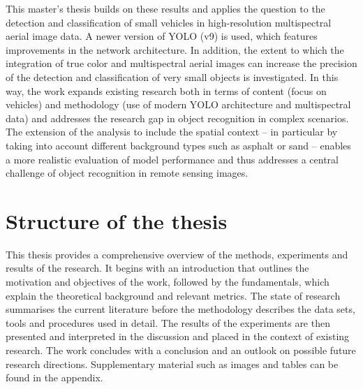 This master's thesis builds on these results and applies the question to the detection and classification of small vehicles in high-resolution multispectral aerial image data. A newer version of \acrshort{YOLO} (v9) is used, which features improvements in the network architecture. In addition, the extent to which the integration of true color and multispectral aerial images can increase the precision of the detection and classification of very small objects is investigated. In this way, the work expands existing research both in terms of content (focus on vehicles) and methodology (use of modern \acrshort{YOLO} architecture and multispectral data) and addresses the research gap in object recognition in complex scenarios. The extension of the analysis to include the spatial context – in particular by taking into account different background types such as asphalt or sand – enables a more realistic evaluation of model performance and thus addresses a central challenge of object recognition in remote sensing images.



\section{Structure of the thesis}


This thesis provides a comprehensive overview of the methods, experiments and results of the research. It begins with an introduction that outlines the motivation and objectives of the work, followed by the fundamentals, which explain the theoretical background and relevant metrics. The state of research summarises the current literature before the methodology describes the data sets, tools and procedures used in detail. The results of the experiments are then presented and interpreted in the discussion and placed in the context of existing research. The work concludes with a conclusion and an outlook on possible future research directions. Supplementary material such as images and tables can be found in the appendix.
